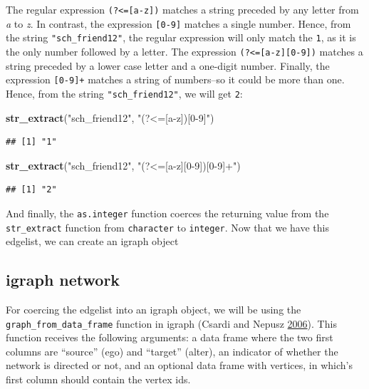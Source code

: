 \documentclass[]{book}
\newenvironment{Shaded}{\begin{snugshade}}{\end{snugshade}}
\newcommand{\KeywordTok}[1]{\textcolor[rgb]{0.13,0.29,0.53}{\textbf{#1}}}
\newcommand{\NormalTok}[1]{#1}
\newcommand{\StringTok}[1]{\textcolor[rgb]{0.31,0.60,0.02}{#1}}
\begin{document}
\begin{enumerate}
  The regular expression \texttt{(?\textless{}={[}a-z{]})} matches a string preceded by any letter from \emph{a} to \emph{z}. In contrast, the expression \texttt{{[}0-9{]}} matches a single number. Hence, from the string \texttt{"sch\_friend12"}, the regular expression will only match the \texttt{1}, as it is the only number followed by a letter. The expression \texttt{(?\textless{}={[}a-z{]}{[}0-9{]})} matches a string preceded by a lower case letter and a one-digit number. Finally, the expression \texttt{{[}0-9{]}+} matches a string of numbers--so it could be more than one. Hence, from the string \texttt{"sch\_friend12"}, we will get \texttt{2}:

\begin{Shaded}
\begin{Highlighting}[]
\KeywordTok{str_extract}\NormalTok{(}\StringTok{"sch_friend12"}\NormalTok{, }\StringTok{"(?<=[a-z])[0-9]"}\NormalTok{)}
\end{Highlighting}
\end{Shaded}

\begin{verbatim}
## [1] "1"
\end{verbatim}

\begin{Shaded}
\begin{Highlighting}[]
\KeywordTok{str_extract}\NormalTok{(}\StringTok{"sch_friend12"}\NormalTok{, }\StringTok{"(?<=[a-z][0-9])[0-9]+"}\NormalTok{)}
\end{Highlighting}
\end{Shaded}

\begin{verbatim}
## [1] "2"
\end{verbatim}

  And finally, the \texttt{as.integer} function coerces the returning value from the \texttt{str\_extract} function from \texttt{character} to \texttt{integer}. Now that we have this edgelist, we can create an igraph object
\end{enumerate}

\hypertarget{igraph-network}{%
\subsection{igraph network}\label{igraph-network}}

For coercing the edgelist into an igraph object, we will be using the \texttt{graph\_from\_data\_frame} function in igraph (Csardi and Nepusz \protect\hyperlink{ref-R-igraph}{2006}). This function receives the following arguments: a data frame where the two first columns are ``source'' (ego) and ``target'' (alter), an indicator of whether the network is directed or not, and an optional data frame with vertices, in which's first column should contain the vertex ids.
\end{document}
